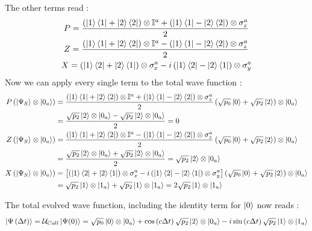\documentclass[a4paper,12pt]{article}
\begin{document}
The other terms read : 
\begin{gather}
	P = \frac{\left( \ket{1}\bra{1} + \ket{2}\bra{2} \right) \otimes \mathbb{I}^{a} + \left( \ket{1}\bra{1} - \ket{2}\bra{2} \right) \otimes \sigma_{z}^{a} }{2} \\
	Z = \frac{\left( \ket{1}\bra{1} + \ket{2}\bra{2} \right) \otimes \mathbb{I}^{a} - \left( \ket{1}\bra{1} - \ket{2}\bra{2} \right) \otimes \sigma_{z}^{a} }{2} \\
	X = \left( \ket{1}\bra{2} + \ket{2}\bra{1} \right) \otimes \sigma_{x}^{a} - i \left( \ket{1}\bra{2} - \ket{2}\bra{1} \right) \otimes \sigma_{y}^{a}
\end{gather}
Now we can apply every single term to the total wave function : 
\begin{align}
	P \left( \ket{\Psi_{S}} \otimes \ket{0_{a}} \right) &= \frac{\left( \ket{1}\bra{1} + \ket{2}\bra{2} \right) \otimes \mathbb{I}^{a} + \left( \ket{1}\bra{1} - \ket{2}\bra{2} \right) \otimes \sigma_{z}^{a} }{2} \left( \sqrt{p_{0}} \ket{0} + \sqrt{p_{2}} \ket{2} \right) \otimes \ket{0_{a}}  \notag \\
	&= \frac{ \sqrt{p_{2}} \ket{2} \otimes \ket{0_{a}} - \sqrt{p_{2}} \ket{2} \otimes \ket{0_{a}} }{2} = 0 \\
	Z \left( \ket{\Psi_{S}} \otimes \ket{0_{a}} \right) &= \frac{\left( \ket{1}\bra{1} + \ket{2}\bra{2} \right) \otimes \mathbb{I}^{a} - \left( \ket{1}\bra{1} - \ket{2}\bra{2} \right) \otimes \sigma_{z}^{a} }{2} \left( \sqrt{p_{0}} \ket{0} + \sqrt{p_{2}} \ket{2} \right) \otimes \ket{0_{a}}  \notag \\
	&= \frac{ \sqrt{p_{2}} \ket{2} \otimes \ket{0_{a}} + \sqrt{p_{2}} \ket{2} \otimes \ket{0_{a}} }{2} = \sqrt{p_{2}} \ket{2} \otimes \ket{0_{a}} \\
	X \left( \ket{\Psi_{S}} \otimes \ket{0_{a}} \right) &= \left[\left( \ket{1}\bra{2} + \ket{2}\bra{1} \right) \otimes \sigma_{x}^{a} - i \left( \ket{1}\bra{2} - \ket{2}\bra{1} \right) \otimes \sigma_{y}^{a}\right] \left( \sqrt{p_{0}} \ket{0} + \sqrt{p_{2}} \ket{2} \right) \otimes \ket{0_{a}}  \notag \\
	&= \sqrt{p_{2}} \ket{1} \otimes \ket{1_{a}} + \sqrt{p_{2}} \ket{1} \otimes \ket{1_{a}} = 2 \sqrt{p_{2}} \ket{1} \otimes \ket{1_{a}} 
\end{align}

The total evolved wave function, including the identity term for $ \ket{0} $ now reads : 
\begin{equation}
	\ket{\Psi \left( \Delta t \right)} = \mathcal{U}_{Coll} \ket{\Psi (0)} = \sqrt{p_{0}} \ket{0} \otimes \ket{0_{a}} + \cos \left( c \Delta t \right) \sqrt{p_{2}} \ket{2} \otimes \ket{0_{a}} - i \sin \left( c \Delta t \right) \sqrt{p_{2}}  \ket{1} \otimes \ket{1_{a}}
\end{equation}
\end{document}
